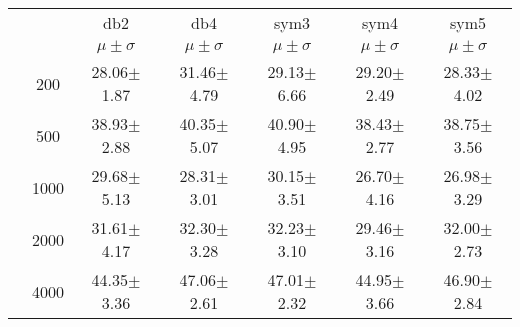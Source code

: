 \begin{table}[H]
\begin{tabular}{|c|c|c c c c c|}
\multicolumn{2}{c|}{}  & db2 & db4 & sym3 & sym4 & sym5 \\\cline{3-7}
\multicolumn{2}{c|}{}& $\mu \pm \sigma$ & $\mu \pm \sigma$ & $\mu \pm \sigma$ & $\mu \pm \sigma$ & $\mu \pm \sigma$ \\\hline

\multicolumn{1}{|c|}{ \multirow{5}{*}{\rotatebox[origin=c]{90}{\textbf{Neurônios}}} }
&200	&28.06$\pm$1.87	&31.46$\pm$4.79	&29.13$\pm$6.66	&29.20$\pm$2.49	&28.33$\pm$4.02\\\cline{2-7}
&500	&38.93$\pm$2.88	&40.35$\pm$5.07	&40.90$\pm$4.95	&38.43$\pm$2.77 &38.75$\pm$3.56\\\cline{2-7}
&1000	&29.68$\pm$5.13	&28.31$\pm$3.01	&30.15$\pm$3.51 &26.70$\pm$4.16	&26.98$\pm$3.29\\\cline{2-7}
&2000	&31.61$\pm$4.17	&32.30$\pm$3.28	&32.23$\pm$3.10	&29.46$\pm$3.16	&32.00$\pm$2.73\\\cline{2-7}
&4000	&44.35$\pm$3.36	&47.06$\pm$2.61	&47.01$\pm$2.32	&44.95$\pm$3.66	&46.90$\pm$2.84


\\\midrule
	\end{tabular}

\end{table} %


